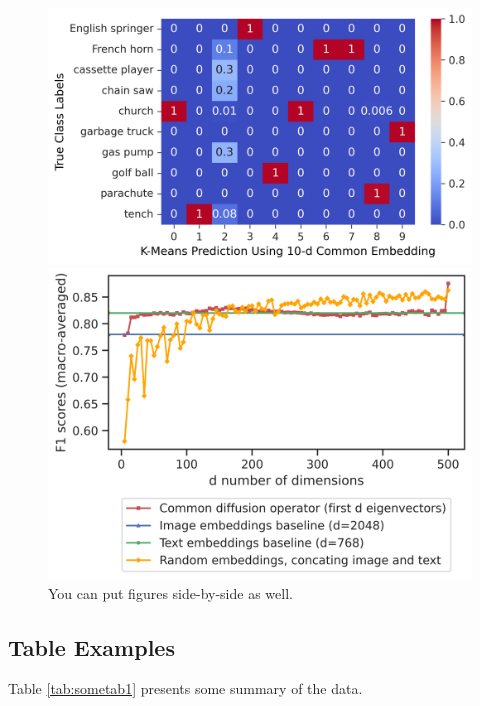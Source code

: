 \begin{figure}[htbp]
\begin{minipage}{0.53\linewidth}
  \centering
  \includegraphics[width=\linewidth]{figure/somefig2.png}
\end{minipage}
\begin{minipage}{0.42\linewidth}
  \centering
  \includegraphics[width=\linewidth]{figure/somefig3.png}
\end{minipage}
\caption{You can put figures side-by-side as well.}
\label{fig:someotherfigs}
\end{figure}


\subsection{Table Examples}

Table \ref{tab:sometab1} presents some summary of the data.

